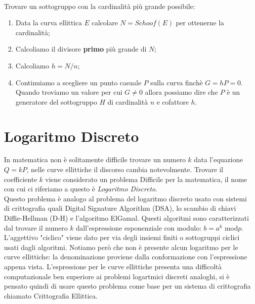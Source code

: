 \documentclass[a4paper,12pt]{tesiinfo}
\begin{document}
\\
Trovare un sottogruppo con la cardinalit\`a pi\`u grande possibile:
\begin{enumerate}
    \item Data la curva ellittica $E$ calcolare $N = Schoof(E)$ per ottenerne la cardinalit\`a;
    \item Calcoliamo il divisore \textbf{primo} pi\`u grande di $N$;
    \item Calcoliamo $h = N \big / n$;
    \item Continuiamo a scegliere un punto casuale $P$ sulla curva finch\`e $G = hP = 0$. Quando troviamo un valore per cui $G \ne 0$ allora possiamo dire che $P$ \`e un generatore del sottogruppo $H$ di cardinalit\`a $n$ e cofattore $h$.
\end{enumerate}

\chapter{Logaritmo Discreto}
In matematica non \`e solitamente difficile trovare un numero $k$ data l'equazione $Q = kP$, nelle curve ellittiche il discorso cambia notevolmente. Trovare il coefficiente $k$ viene considerato un problema Difficile per la matematica, il nome con cui ci riferiamo a questo \`e \textit{Logaritmo Discreto}.
\\
Questo problema \`e analogo al problema del logaritmo discreto usato con sistemi di crittografia quali Digital Signature Algorithm (DSA), lo scambio di chiavi Diffie-Hellman (D-H) e l'algoritmo ElGamal. Questi algoritmi sono caratterizzati dal trovare il numero $k$ dall'espressione esponenziale con modulo: $b = a^k$ mod$p$. 
\\
L'aggettivo "ciclico" viene dato per via degli insiemi finiti o sottogruppi ciclici usati dagli algoritmi. Notiamo per\`o che non \`e presente alcun logaritmo per le curve ellittiche: la denominazione proviene dalla conformazione con l'espressione appena vista. L'espressione per le curve ellittiche presenta una difficolt\`a computazionale ben superiore ai problemi logartmici discreti analoghi, si \`e pensato quindi di usare questo problema come base per un sistema di crittografia chiamato Crittografia Ellittica.




%
%
%
%
%
%
%
%
%
%
%
%
%
%
%
%
%
%
%
%
%
%
%
%
%
%
%
%
%
%
%
%
%
%
%
%
%
%
%
%
%
\end{document}
